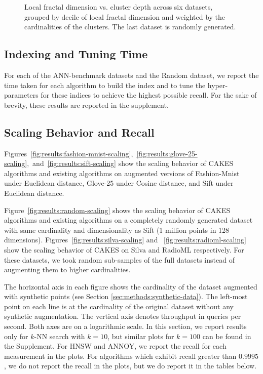 \begin{figure}
\begin{subfigure}[b]{0.47\textwidth}
        \label{fig:results:random-lfd}
    \end{subfigure}
    \vspace{1em}
    \caption{Local fractal dimension vs. cluster depth across six datasets, grouped by decile of local fractal dimension and weighted by the cardinalities of the clusters.
    The last dataset is randomly generated.}
    \label{fig:results:lfd-plots}
\end{figure}


\subsection{Indexing and Tuning Time}
\label{sec:results:indexing-and-tuning-time}

For each of the ANN-benchmark datasets and the Random dataset, we report the time taken for each algorithm to build the index and to tune the hyper-parameters for these indices to achieve the highest possible recall. For the sake of brevity, these results are reported in the supplement.







\subsection{Scaling Behavior and Recall}
\label{sec:results:scaling-behavior-and-recall}

Figures~\ref{fig:results:fashion-mnist-scaling},~\ref{fig:results:glove-25-scaling},~and~\ref{fig:results:sift-scaling} show the scaling behavior of CAKES algorithms and existing algorithms on augmented versions of Fashion-Mnist under Euclidean distance,
Glove-25 under Cosine distance, and
Sift under Euclidean distance.

Figure~\ref{fig:results:random-scaling} shows the scaling behavior of CAKES algorithms and existing algorithms on a completely randomly generated dataset with same cardinality and dimensionality as Sift (1 million points in 128 dimensions).
Figures~\ref{fig:results:silva-scaling} and ~\ref{fig:results:radioml-scaling} show the scaling behavior of CAKES on Silva and RadioML respectively.
For these datasets, we took random sub-samples of the full datasets instead of augmenting them to higher cardinalities.

The horizontal axis in each figure shows the cardinality of the dataset augmented with synthetic points (see Section \ref{sec:methods:synthetic-data}).
The left-most point on each line is at the cardinality of the original dataset without any synthetic augmentation.
The vertical axis denotes throughput in queries per second.
Both axes are on a logarithmic scale.
In this section, we report results only for $k$-NN search with $k = 10$, but similar plots for $k = 100$ can be found in the Supplement.
For HNSW and ANNOY, we report the recall for each measurement in the plots. For algorithms which exhibit recall greater than $0.9995$, we do not report the recall in the plots, but we do report it in the tables below.

